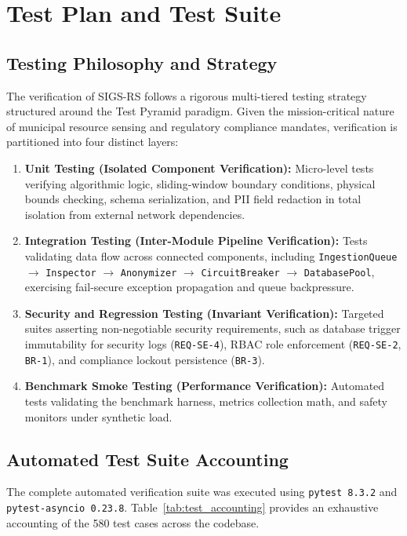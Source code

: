 \section{Test Plan and Test Suite}

\subsection{Testing Philosophy and Strategy}
The verification of SIGS-RS follows a rigorous multi-tiered testing strategy structured around the Test Pyramid paradigm. Given the mission-critical nature of municipal resource sensing and regulatory compliance mandates, verification is partitioned into four distinct layers:
\begin{enumerate}
    \item \textbf{Unit Testing (Isolated Component Verification):} Micro-level tests verifying algorithmic logic, sliding-window boundary conditions, physical bounds checking, schema serialization, and PII field redaction in total isolation from external network dependencies.
    \item \textbf{Integration Testing (Inter-Module Pipeline Verification):} Tests validating data flow across connected components, including \texttt{IngestionQueue} $\rightarrow$ \texttt{Inspector} $\rightarrow$ \texttt{Anonymizer} $\rightarrow$ \texttt{CircuitBreaker} $\rightarrow$ \texttt{DatabasePool}, exercising fail-secure exception propagation and queue backpressure.
    \item \textbf{Security and Regression Testing (Invariant Verification):} Targeted suites asserting non-negotiable security requirements, such as database trigger immutability for security logs (\texttt{REQ-SE-4}), RBAC role enforcement (\texttt{REQ-SE-2}, \texttt{BR-1}), and compliance lockout persistence (\texttt{BR-3}).
    \item \textbf{Benchmark Smoke Testing (Performance Verification):} Automated tests validating the benchmark harness, metrics collection math, and safety monitors under synthetic load.
\end{enumerate}

\subsection{Automated Test Suite Accounting}
The complete automated verification suite was executed using \texttt{pytest 8.3.2} and \texttt{pytest-asyncio 0.23.8}. Table~\ref{tab:test_accounting} provides an exhaustive accounting of the 580 test cases across the codebase.

